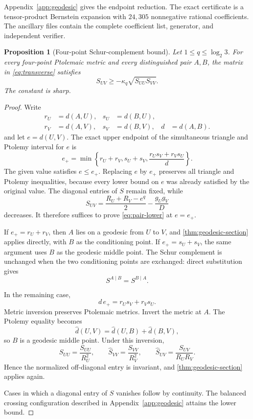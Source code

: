 \documentclass[11pt]{amsart}
\newtheorem{proposition}[proposition]{Proposition}
\theoremstyle{definition}
\theoremstyle{remark}
\begin{document}
Appendix~\ref{app:geodesic} gives the endpoint reduction. The exact
certificate is a tensor-product Bernstein expansion with $24{,}305$
nonnegative rational coefficients. The ancillary files contain the
complete coefficient list, generator, and independent verifier.

\begin{proposition}[Four-point Schur-complement bound]\label{prop:transverse}
Let $1\le q\le\log_2 3$. For every four-point Ptolemaic metric and
every distinguished pair $A,B$, the matrix in \eqref{eq:transverse}
satisfies
\begin{equation}\label{eq:pair-lower}
 S_{UV}\ge-\kappa_q\sqrt{S_{UU}S_{VV}}.
\end{equation}
The constant is sharp.
\end{proposition}

\begin{proof}
Write
\[
 \begin{aligned}
 r_U&=d(A,U),& s_U&=d(B,U),\\
 r_V&=d(A,V),& s_V&=d(B,V),& d&=d(A,B).
 \end{aligned}
\]
and let $e=d(U,V)$. The exact upper endpoint of the simultaneous triangle and Ptolemy interval for $e$ is
\begin{equation}\label{eq:upper-endpoint}
 e_+=\min\left\{
 r_U+r_V,
 s_U+s_V,
 \frac{r_Us_V+r_Vs_U}{d}
 \right\}.
\end{equation}
The given value satisfies $e\le e_+$. Replacing $e$ by $e_+$ preserves all triangle and Ptolemy inequalities, because every lower bound on $e$ was already satisfied by the original value. The diagonal entries of $S$ remain fixed, while
\[
 S_{UV}=\frac{R_U+R_V-e^q}{2}-\frac{g_Ug_V}{D}
\]
decreases. It therefore suffices to prove \eqref{eq:pair-lower} at $e=e_+$.

If $e_+=r_U+r_V$, then $A$ lies on a geodesic from $U$ to $V$, and
\cref{thm:geodesic-section} applies directly, with $B$ as the conditioning
point. If $e_+=s_U+s_V$, the same argument uses $B$ as the geodesic middle
point. The Schur complement is unchanged when the two conditioning points
are exchanged: direct substitution gives
\[
 S^{A\mid B}=S^{B\mid A}.
\]

In the remaining case,
\[
 d\,e_+=r_Us_V+r_Vs_U.
\]
Metric inversion preserves Ptolemaic metrics. Invert the metric at $A$. The Ptolemy equality becomes
\[
 \widehat d(U,V)=\widehat d(U,B)+\widehat d(B,V),
\]
so $B$ is a geodesic middle point. Under this inversion,
\[
 \widehat S_{UU}=\frac{S_{UU}}{R_U^2},
 \qquad
 \widehat S_{VV}=\frac{S_{VV}}{R_V^2},
 \qquad
 \widehat S_{UV}=\frac{S_{UV}}{R_UR_V}.
\]
Hence the normalized off-diagonal entry is invariant, and
\cref{thm:geodesic-section} applies again.

Cases in which a diagonal entry of $S$ vanishes follow by continuity. The
balanced crossing configuration described in Appendix~\ref{app:geodesic}
attains the lower bound.
\end{proof}
\end{document}
